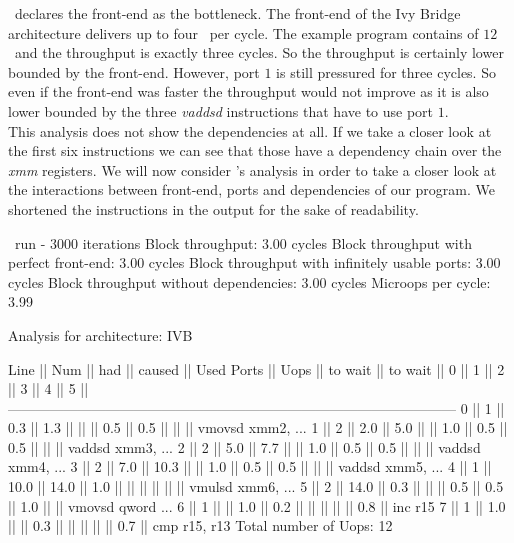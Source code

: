 \iaca\ declares the front-end as the bottleneck. The front-end of the Ivy Bridge architecture delivers up to four \microops\ per cycle. The example program contains of $12$ \microops\ and the throughput is exactly three cycles. So the throughput is certainly lower bounded by the front-end. However, port $1$ is still pressured for three cycles. So even if the front-end was faster the throughput would not improve as it is also lower bounded by the three \emph{vaddsd} instructions that have to use port $1$.\\
This analysis does not show the dependencies at all. If we take a closer look at the first six instructions we can see that those have a dependency chain over the \emph{xmm} registers. We will now consider \suaca's analysis in order to take a closer look at the interactions between front-end, ports and dependencies of our program. We shortened the instructions in the output for the sake of readability.

\begin{LabeledExample}{\suaca\ run - $3000$ iterations}{\label{ex:suaca3000}}
    Block throughput: 3.00 cycles
    Block throughput with perfect front-end: 3.00 cycles
    Block throughput with infinitely usable ports: 3.00 cycles
    Block throughput without dependencies: 3.00 cycles
    Microops per cycle: 3.99
    
    Analysis for architecture: IVB
    
     Line  ||   Num   ||   had   || caused  ||            Used Ports
           ||   Uops  || to wait || to wait ||   0   ||   1   ||   2   ||   3   ||   4   ||   5   ||
     ------------------------------------------------------------------------------------------------
       0   ||    1    ||   0.3   ||   1.3   ||       ||       ||  0.5  ||  0.5  ||       ||       || vmovsd xmm2, ...
       1   ||    2    ||   2.0   ||   5.0   ||       ||  1.0  ||  0.5  ||  0.5  ||       ||       || vaddsd xmm3, ...
       2   ||    2    ||   5.0   ||   7.7   ||       ||  1.0  ||  0.5  ||  0.5  ||       ||       || vaddsd xmm4, ...
       3   ||    2    ||   7.0   ||  10.3   ||       ||  1.0  ||  0.5  ||  0.5  ||       ||       || vaddsd xmm5, ...
       4   ||    1    ||  10.0   ||  14.0   ||  1.0  ||       ||       ||       ||       ||       || vmulsd xmm6, ...
       5   ||    2    ||  14.0   ||   0.3   ||       ||       ||  0.5  ||  0.5  ||  1.0  ||       || vmovsd qword ...
       6   ||    1    ||         ||   1.0   ||  0.2  ||       ||       ||       ||       ||  0.8  || inc r15
       7   ||    1    ||   1.0   ||         ||  0.3  ||       ||       ||       ||       ||  0.7  || cmp r15, r13
    Total number of Uops: 12
\end{LabeledExample}  

